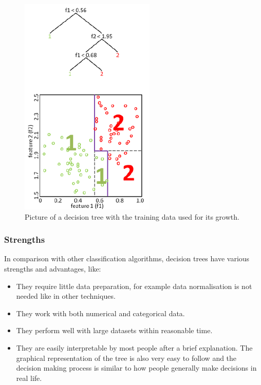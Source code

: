 \documentclass[11pt]{article}
\begin{document}
        \begin{figure}
          \centering
          \includegraphics{thesis_res/decision_tree.png}
          \caption{Picture of a decision tree with the training data used for its growth. \cite{digstaining}}
          \label{figure:decision_tree}
        \end{figure}
      \subsubsection{Strengths}
        In comparison with other classification algorithms, decision trees have various strengths and advantages, like:
        \begin{itemize}
        \item They require little data preparation, for example data normalisation is not needed like in other techniques. \cite{isl}
        \item They work with both numerical and categorical data. \cite{isl}
        \item They perform well with large datasets within reasonable time. \cite{breiman}
        \item They are easily interpretable by most people after a brief explanation. The graphical representation of the tree is also very easy to follow and the decision making process is similar to how people generally make decisions in real life. \cite{isl}
        \end{itemize}
\end{document}
